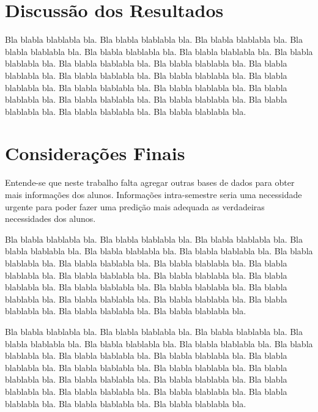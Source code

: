 \documentclass[diss,capa]{texufpel}
\begin{document}
\chapter{Discussão dos Resultados}

  Bla blabla blablabla bla.  Bla blabla blablabla bla.  Bla blabla
  blablabla bla.  Bla blabla blablabla bla.  Bla blabla blablabla bla.
  Bla blabla blablabla bla.  Bla blabla blablabla bla.  Bla blabla
  blablabla bla.  Bla blabla blablabla bla.  Bla blabla blablabla bla.
  Bla blabla blablabla bla.  Bla blabla blablabla bla.  Bla blabla
  blablabla bla.  Bla blabla blablabla bla.  Bla blabla blablabla bla.
  Bla blabla blablabla bla.  Bla blabla blablabla bla.  Bla blabla
  blablabla bla.  Bla blabla blablabla bla.  Bla blabla blablabla bla.
  Bla blabla blablabla bla.

\chapter{Considerações Finais}

Entende-se que neste trabalho falta agregar outras bases de dados para obter mais informações dos alunos.
Informações intra-semestre seria uma necessidade urgente para poder fazer uma predição mais adequada as verdadeiras necessidades dos alunos.

Bla blabla blablabla bla.  Bla blabla blablabla bla.  Bla blabla
blablabla bla.  Bla blabla blablabla bla.  Bla blabla blablabla bla.
Bla blabla blablabla bla.  Bla blabla blablabla bla.  Bla blabla
blablabla bla.  Bla blabla blablabla bla.  Bla blabla blablabla bla.
Bla blabla blablabla bla.  Bla blabla blablabla bla.  Bla blabla
blablabla bla.  Bla blabla blablabla bla.  Bla blabla blablabla bla.
Bla blabla blablabla bla.  Bla blabla blablabla bla.  Bla blabla
blablabla bla.  Bla blabla blablabla bla.  Bla blabla blablabla bla.
Bla blabla blablabla bla.

Bla blabla blablabla bla.  Bla blabla blablabla bla.  Bla blabla
blablabla bla.  Bla blabla blablabla bla.  Bla blabla blablabla bla.
Bla blabla blablabla bla.  Bla blabla blablabla bla.  Bla blabla
blablabla bla.  Bla blabla blablabla bla.  Bla blabla blablabla bla.
Bla blabla blablabla bla.  Bla blabla blablabla bla.  Bla blabla
blablabla bla.  Bla blabla blablabla bla.  Bla blabla blablabla bla.
Bla blabla blablabla bla.  Bla blabla blablabla bla.  Bla blabla
blablabla bla.  Bla blabla blablabla bla.  Bla blabla blablabla bla.
Bla blabla blablabla bla.

\end{document}
